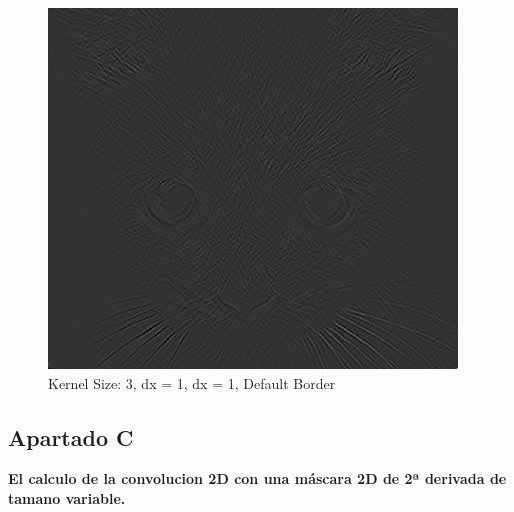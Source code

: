\documentclass{article}
\begin{document}
\begin{minipage}{\linewidth}
    \centering
    \begin{minipage}{0.45\linewidth}
        \begin{figure}[H]
			\includegraphics[width=\linewidth]{Ejercicio2b/cat(3,1,1)_DEFAULT.png}             			
			\caption{Kernel Size: 3, dx = 1, dx = 1,  Default Border}
        \end{figure}
    \end{minipage}   
\end{minipage}

\subsection*{Apartado C}
\textbf{El calculo de la convolucion 2D con una máscara 2D de 2ª derivada de tamano variable.}
\end{document}
